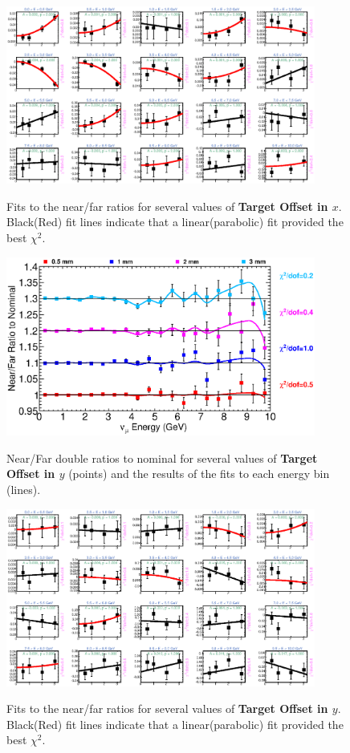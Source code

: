 \begin{figure}[hb]
  \begin{center}
    {\includegraphics[width=4.0in]{figures/TargetXOffset_nof_fits.eps}}
  \end{center}
\caption{ Fits to the near/far ratios for several values of {\bf Target Offset in $x$}. Black(Red) fit lines indicate that a linear(parabolic) fit provided the best $\chi^2$. }
\end{figure}

\begin{figure}[ht]
  \begin{center}
    {\includegraphics[width=4.0in]{figures/TargetYOffset_nof_summary.eps}}
  \end{center}
\caption{ Near/Far double ratios to nominal for several values of {\bf Target Offset in $y$} (points) and the results of the fits to each energy bin (lines).}
\end{figure}

\begin{figure}[hb]
  \begin{center}
    {\includegraphics[width=4.0in]{figures/TargetYOffset_nof_fits.eps}}
  \end{center}
\caption{ Fits to the near/far ratios for several values of {\bf Target Offset in $y$}. Black(Red) fit lines indicate that a linear(parabolic) fit provided the best $\chi^2$. }
\end{figure}

